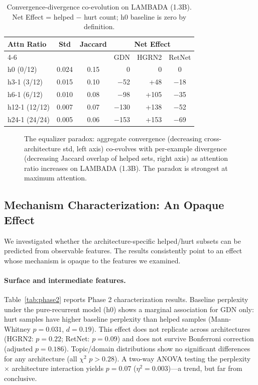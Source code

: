 \documentclass[11pt,a4paper]{article}
\begin{document}
\begin{table}[t]
\centering
\small
\caption{Convergence-divergence co-evolution on LAMBADA (1.3B). Net Effect = helped $-$ hurt count; h0 baseline is zero by definition.}
\label{tab:coevolution}
\begin{tabular}{@{}lccrrc@{}}
\toprule
Attn Ratio & Std & Jaccard & \multicolumn{3}{c}{Net Effect} \\
\cmidrule(lr){4-6}
 & & & GDN & HGRN2 & RetNet \\
\midrule
h0 (0/12) & 0.024 & 0.15 & 0 & 0 & 0 \\
h3-1 (3/12) & 0.015 & 0.10 & $-$52 & +48 & $-$18 \\
h6-1 (6/12) & 0.010 & 0.08 & $-$98 & +105 & $-$35 \\
h12-1 (12/12) & 0.007 & 0.07 & $-$130 & +138 & $-$52 \\
h24-1 (24/24) & 0.005 & 0.06 & $-$153 & +153 & $-$69 \\
\bottomrule
\end{tabular}
\end{table}

\begin{figure}[t]
\centering
{}
\caption{The equalizer paradox: aggregate convergence (decreasing cross-architecture std, left axis) co-evolves with per-example divergence (decreasing Jaccard overlap of helped sets, right axis) as attention ratio increases on LAMBADA (1.3B). The paradox is strongest at maximum attention.}
\label{fig:paradox}
\end{figure}

\subsection{Mechanism Characterization: An Opaque Effect}
\label{sec:mechanism}

We investigated whether the architecture-specific helped/hurt subsets can be predicted from observable features. The results consistently point to an effect whose mechanism is opaque to the features we examined.

\paragraph{Surface and intermediate features.}
Table~\ref{tab:phase2} reports Phase 2 characterization results. Baseline perplexity under the pure-recurrent model (h0) shows a marginal association for GDN only: hurt samples have higher baseline perplexity than helped samples (Mann-Whitney $p{=}0.031$, $d{=}0.19$). This effect does not replicate across architectures (HGRN2: $p{=}0.22$; RetNet: $p{=}0.09$) and does not survive Bonferroni correction (adjusted $p{=}0.186$). Topic/domain distributions show no significant differences for any architecture (all $\chi^2$ $p > 0.28$). A two-way ANOVA testing the perplexity $\times$ architecture interaction yields $p{=}0.07$ ($\eta^2{=}0.003$)---a trend, but far from conclusive.
\end{document}
